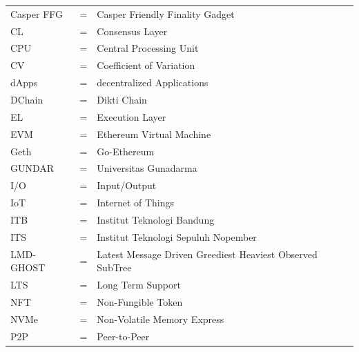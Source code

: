 \begin{longtable}[l]{llp{3in}}
	Casper FFG & \hspace{1.5cm} = & Casper Friendly Finality Gadget \\
	CL & \hspace{1.5cm} = & Consensus Layer \\
	CPU & \hspace{1.5cm} = & Central Processing Unit \\
	CV & \hspace{1.5cm} = & Coefficient of Variation \\
	dApps & \hspace{1.5cm} = & decentralized Applications \\
	DChain & \hspace{1.5cm} = & Dikti Chain \\
	EL & \hspace{1.5cm} = & Execution Layer \\
	EVM & \hspace{1.5cm} = & Ethereum Virtual Machine \\
	Geth & \hspace{1.5cm} = & Go-Ethereum \\
	GUNDAR & \hspace{1.5cm} = & Universitas Gunadarma \\
	I/O & \hspace{1.5cm} = & Input/Output \\
	IoT & \hspace{1.5cm} = & Internet of Things \\
	ITB & \hspace{1.5cm} = & Institut Teknologi Bandung \\
	ITS & \hspace{1.5cm} = & Institut Teknologi Sepuluh Nopember \\
	LMD-GHOST & \hspace{1.5cm} = & Latest Message Driven Greediest Heaviest Observed SubTree \\
	LTS & \hspace{1.5cm} = & Long Term Support \\
	NFT & \hspace{1.5cm} = & Non-Fungible Token \\
	NVMe & \hspace{1.5cm} = & Non-Volatile Memory Express \\
	P2P & \hspace{1.5cm} = & Peer-to-Peer \\

\end{longtable}
